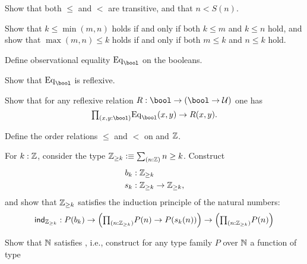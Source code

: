 \begin{exercises}
\begin{subexenum}
  \item Show that both $\leq$ and $<$ are transitive, and that $n<S(n)$.
  \item Show that $k\leq \min(m,n)$ holds if and only if both $k\leq m$ and $k\leq n$ hold, and show that $\max(m,n)\leq k$ holds if and only if both $m\leq k$ and $n\leq k$ hold.
  \end{subexenum}
\item \label{ex:obs_bool}
  \begin{subexenum}
  \item Define observational equality $\mathrm{Eq}_\bool$ on the booleans.
  \item Show that $\mathrm{Eq}_\bool$ is reflexive.
  \item Show that for any reflexive relation $R:\bool\to(\bool\to \UU)$ one has
    \begin{equation*}
      \prd{x,y:\bool} \mathrm{Eq}_\bool(x,y)\to R(x,y).
    \end{equation*}
  \end{subexenum}
\item \label{ex:int_order}
  \begin{subexenum}
  \item Define the order relations $\leq$ and $<$ on and $\mathbb{Z}$.
  \item For $k:\mathbb{Z}$, consider the type $\Z_{\geq k}\defeq \sm{n:\Z}n\geq k$. Construct
    \begin{align*}
      b_k & : \mathbb{Z}_{\geq k} \\
      s_k & : \mathbb{Z}_{\geq k}\to\mathbb{Z}_{\geq k},
    \end{align*}
    and show that $\mathbb{Z}_{\geq k}$ satisfies the induction principle of the natural numbers:
    \begin{equation*}
      \ind{\Z_{\geq k}} : P(b_k)\to \Big(\prd{n:\Z_{\geq k}} P(n)\to P(s_k(n))\Big)\to \Big(\prd{n:\Z_{\geq k}} P(n)\Big)
    \end{equation*}
  \end{subexenum}
\item
  \begin{subexenum}
  \item Show that $\mathbb{N}$ satisfies , i.e., construct for any type family $P$ over $\mathbb{N}$ a function of type

\end{subexenum}
\end{exercises}
